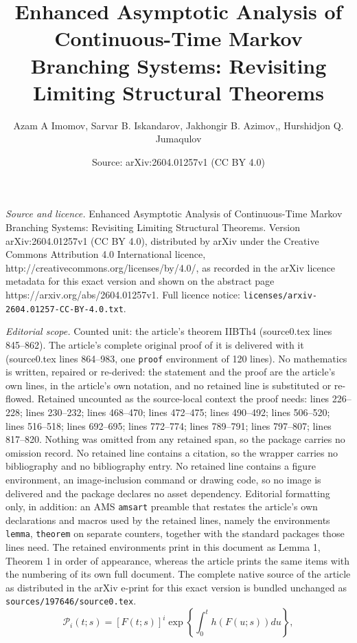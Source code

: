 \documentclass[10pt,a4paper]{amsart}
\title{Enhanced Asymptotic Analysis of Continuous-Time Markov Branching Systems: Revisiting Limiting Structural Theorems}
\author{Azam A Imomov, Sarvar B. Iskandarov, Jakhongir B. Azimov,, Hurshidjon Q. Jumaqulov}
\date{Source: arXiv:2604.01257v1 (CC BY 4.0)}
\begin{document}
\maketitle

\noindent\emph{Source and licence.} Enhanced Asymptotic Analysis of Continuous-Time Markov Branching Systems: Revisiting Limiting Structural Theorems. Version arXiv:2604.01257v1 (CC BY 4.0), distributed by arXiv under the Creative Commons Attribution 4.0 International licence, http://creativecommons.org/licenses/by/4.0/, as recorded in the arXiv licence metadata for this exact version and shown on the abstract page https://arxiv.org/abs/2604.01257v1. Full licence notice: \texttt{licenses/arxiv-2604.01257-CC-BY-4.0.txt}.\par\smallskip

\noindent\textit{Editorial scope.} Counted unit: the article's theorem IIBTh4 (source0.tex lines 845--862). The article's complete original proof of it is delivered with it (source0.tex lines 864--983, one \texttt{proof} environment of 120 lines). No mathematics is written, repaired or re-derived: the statement and the proof are the article's own lines, in the article's own notation, and no retained line is substituted or re-flowed.  Retained uncounted as the source-local context the proof needs: lines 226--228; lines 230--232; lines 468--470; lines 472--475; lines 490--492; lines 506--520; lines 516--518; lines 692--695; lines 772--774; lines 789--791; lines 797--807; lines 817--820.  Nothing was omitted from any retained span, so the package carries no omission record.  No retained line contains a citation, so the wrapper carries no bibliography and no bibliography entry.  No retained line contains a figure environment, an image-inclusion command or drawing code, so no image is delivered and the package declares no asset dependency.  Editorial formatting only, in addition: an AMS \texttt{amsart} preamble that restates the article's own declarations and macros used by the retained lines, namely the environments \texttt{lemma}, \texttt{theorem} on separate counters, together with the standard packages those lines need.  The retained environments print in this document as Lemma 1, Theorem 1 in order of appearance, whereas the article prints the same items with the numbering of its own full document.  The complete native source of the article as distributed in the arXiv e-print for this exact version is bundled unchanged as \texttt{sources/197646/source0.tex}.
\begin{equation}                            \label{IIB2.1}
    {\mathcal{P}_{i}(t;s)}=\left[F(t;s)\right]^{i}\exp\left\{\int_{0}^{t}h\left(F(u;s)\right)du\right\},
\end{equation}
\end{document}
